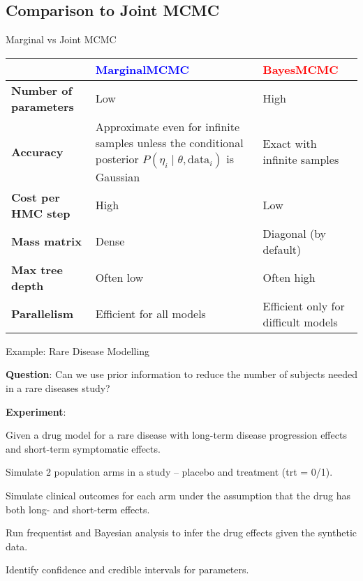 \subsection{Comparison to Joint MCMC}
\begin{frame}{Marginal vs Joint MCMC}
	\centering
	\small
	\begin{tabular}{|l|p{}|p{}|}
		\toprule
        & \textcolor{blue}{\textbf{MarginalMCMC}} & \textcolor{red}{\textbf{BayesMCMC}} \\ \midrule
		\textbf{Number of parameters} & Low & High \\ \midrule
		\textbf{Accuracy} & Approximate even for infinite samples unless the conditional posterior $P(\eta_i \mid \theta, \text{data}_i)$ is Gaussian & Exact with infinite samples \\ \midrule
		\textbf{Cost per HMC step} & High & Low \\ \midrule
		\textbf{Mass matrix} & Dense & Diagonal (by default) \\ \midrule
		\textbf{Max tree depth} & Often low & Often high \\ \midrule
		\textbf{Parallelism} & Efficient for all models & Efficient only for difficult models \\
		\bottomrule
	\end{tabular}
\end{frame}

\begin{frame}{Example: Rare Disease Modelling}
	\begin{vfilleditems}
		\item \textbf{Question}: Can we use prior information to reduce the number of subjects needed in a rare diseases study?
		\item \textbf{Experiment}:
			\begin{vfilleditems}
				\item Given a drug model for a rare disease with long-term disease progression effects and short-term symptomatic effects.
				\item Simulate 2 population arms in a study – placebo and treatment (trt = 0/1).
				\item Simulate clinical outcomes for each arm under the assumption that the drug has both long- and short-term effects.
				\item Run frequentist and Bayesian analysis to infer the drug effects given the synthetic data.
				\item Identify confidence and credible intervals for parameters.
			\end{vfilleditems}
	\end{vfilleditems}
\end{frame}

